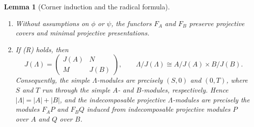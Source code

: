 \documentclass[11pt,reqno]{amsart}
\newtheorem{lemma}[theorem]{Lemma}
\theoremstyle{definition}
\theoremstyle{remark}
\numberwithin{equation}{section}
\begin{document}
\begin{lemma}[Corner induction and the radical formula]\label{lem:radical-context}
\begin{enumerate}[label=\textup{(\arabic*)},leftmargin=2.2em]
 \item Without assumptions on $\phi$ or $\psi$, the functors $F_A$ and $F_B$
 preserve projective covers and minimal projective presentations.
 \item If \textup{(R)} holds, then
 \begin{equation}\label{eq:radical-formula}
  J(\Lambda)=
  \begin{pmatrix}J(A)&N\\M&J(B)\end{pmatrix},
  \qquad
 \Lambda/J(\Lambda)\cong A/J(A)\times B/J(B).
 \end{equation}
 Consequently, the simple $\Lambda$-modules are precisely $(S,0)$ and
 $(0,T)$, where $S$ and $T$ run through the simple $A$- and $B$-modules,
 respectively.  Hence $|\Lambda|=|A|+|B|$, and the indecomposable
 projective $\Lambda$-modules are precisely the modules $F_AP$ and $F_BQ$
 induced from indecomposable projective modules $P$ over $A$ and $Q$ over
 $B$.
\end{enumerate}
\end{lemma}
\end{document}
